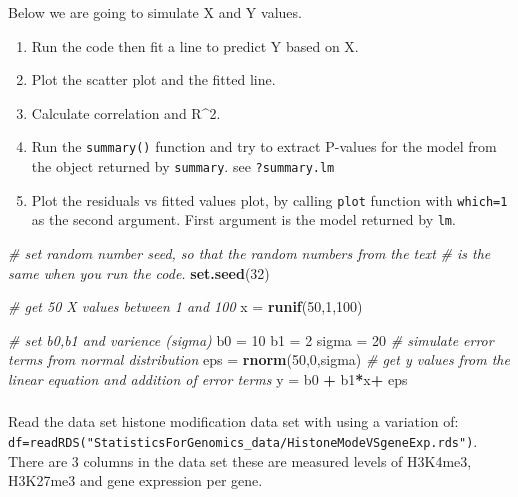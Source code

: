 \documentclass[12pt,]{krantz}
\newenvironment{Shaded}{\begin{snugshade}}{\end{snugshade}}
\newcommand{\CommentTok}[1]{\textcolor[rgb]{0.56,0.35,0.01}{\textit{#1}}}
\newcommand{\DecValTok}[1]{\textcolor[rgb]{0.00,0.00,0.81}{#1}}
\newcommand{\KeywordTok}[1]{\textcolor[rgb]{0.13,0.29,0.53}{\textbf{#1}}}
\newcommand{\NormalTok}[1]{#1}
\newcommand{\OperatorTok}[1]{\textcolor[rgb]{0.81,0.36,0.00}{\textbf{#1}}}
\newcommand{\StringTok}[1]{\textcolor[rgb]{0.31,0.60,0.02}{#1}}
\providecommand{\tightlist}{%
  \setlength{\itemsep}{0pt}\setlength{\parskip}{0pt}}
\theoremstyle{definition}
\theoremstyle{definition}
\theoremstyle{definition}
\theoremstyle{remark}
\begin{document}
Below we are going to simulate X and Y values.

\begin{enumerate}
\def\labelenumi{\arabic{enumi}.}
\tightlist
\item
  Run the code then fit a line to predict Y based on X.
\item
  Plot the scatter plot and the fitted line.
\item
  Calculate correlation and R\^{}2.
\item
  Run the \texttt{summary()} function and try to extract P-values for
  the model from the object returned by \texttt{summary}. see
  \texttt{?summary.lm}
\item
  Plot the residuals vs fitted values plot, by calling \texttt{plot}
  function with \texttt{which=1} as the second argument. First argument
  is the model returned by \texttt{lm}.
\end{enumerate}

\begin{Shaded}
\begin{Highlighting}[]
\CommentTok{# set random number seed, so that the random numbers from the text}
\CommentTok{# is the same when you run the code.}
\KeywordTok{set.seed}\NormalTok{(}\DecValTok{32}\NormalTok{)}

\CommentTok{# get 50 X values between 1 and 100}
\NormalTok{x =}\StringTok{ }\KeywordTok{runif}\NormalTok{(}\DecValTok{50}\NormalTok{,}\DecValTok{1}\NormalTok{,}\DecValTok{100}\NormalTok{)}

\CommentTok{# set b0,b1 and varience (sigma)}
\NormalTok{b0 =}\StringTok{ }\DecValTok{10}
\NormalTok{b1 =}\StringTok{ }\DecValTok{2}
\NormalTok{sigma =}\StringTok{ }\DecValTok{20}
\CommentTok{# simulate error terms from normal distribution}
\NormalTok{eps =}\StringTok{ }\KeywordTok{rnorm}\NormalTok{(}\DecValTok{50}\NormalTok{,}\DecValTok{0}\NormalTok{,sigma)}
\CommentTok{# get y values from the linear equation and addition of error terms}
\NormalTok{y =}\StringTok{ }\NormalTok{b0 }\OperatorTok{+}\StringTok{ }\NormalTok{b1}\OperatorTok{*}\NormalTok{x}\OperatorTok{+}\StringTok{ }\NormalTok{eps}
\end{Highlighting}
\end{Shaded}

\hypertarget{section-8}{%
\subsubsection{}\label{section-8}}

Read the data set histone modification data set with using a variation
of:
\texttt{df=readRDS("StatisticsForGenomics\_data/HistoneModeVSgeneExp.rds")}.
There are 3 columns in the data set these are measured levels of
H3K4me3, H3K27me3 and gene expression per gene.
\end{document}
